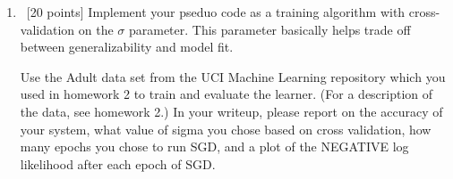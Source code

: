\begin{enumerate}
\item ~[20 points] Implement your pseduo code as a training algorithm with
  cross-validation on the $\sigma$ parameter.  This parameter
  basically helps trade off between generalizability and model fit.  

  Use the Adult data set from the UCI Machine Learning repository which you used in homework 2 to train and evaluate the learner. (For a description of the data, see homework 2.) In your writeup,
  please report on the accuracy of your system, what value of sigma
  you chose based on cross validation, how many epochs you chose to
  run SGD, and a plot of the NEGATIVE log likelihood after each epoch
  of SGD.



\end{enumerate}




